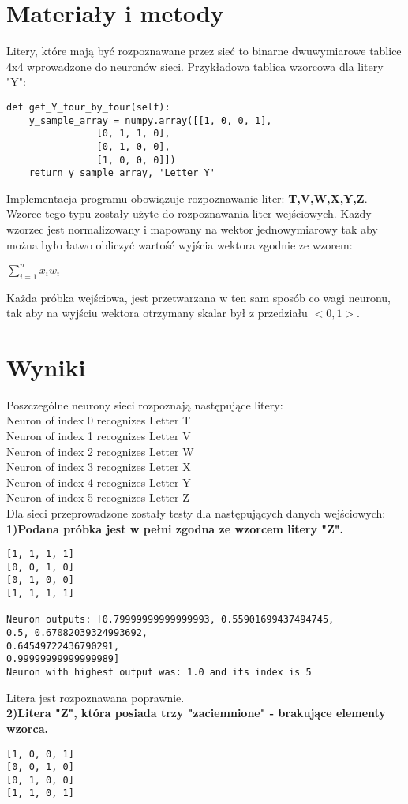 \documentclass{classrep}
\begin{document}
\section{Materiały i metody}
{Litery, które mają być rozpoznawane przez sieć to binarne dwuwymiarowe tablice 4x4 wprowadzone do neuronów sieci. Przykładowa tablica wzorcowa dla litery "Y":
\begin{lstlisting}
def get_Y_four_by_four(self):
	y_sample_array = numpy.array([[1, 0, 0, 1],
				[0, 1, 1, 0],
				[0, 1, 0, 0],
				[1, 0, 0, 0]])
	return y_sample_array, 'Letter Y'
\end{lstlisting}
Implementacja programu obowiązuje rozpoznawanie liter: \textbf{T,V,W,X,Y,Z}. Wzorce tego typu zostały użyte do rozpoznawania liter wejściowych. Każdy wzorzec jest normalizowany i mapowany na wektor jednowymiarowy tak aby można było łatwo obliczyć wartość wyjścia wektora zgodnie ze wzorem:
\begin{center}$\sum_{i=1}^{n} x_iw_i$\end{center}

Każda próbka wejściowa, jest przetwarzana w ten sam sposób co wagi neuronu, tak aby na wyjściu wektora otrzymany skalar był z przedziału $<0,1>$.
\section{Wyniki}
{Poszczególne neurony sieci rozpoznają następujące litery:
\\Neuron of index 0 recognizes Letter T
\\Neuron of index 1 recognizes Letter V
\\Neuron of index 2 recognizes Letter W
\\Neuron of index 3 recognizes Letter X
\\Neuron of index 4 recognizes Letter Y
\\Neuron of index 5 recognizes Letter Z
\\Dla sieci przeprowadzone zostały testy dla następujących danych wejściowych:\\
\textbf{1)Podana próbka jest w pełni zgodna ze wzorcem litery "Z".}
\begin{lstlisting}
[1, 1, 1, 1]
[0, 0, 1, 0]
[0, 1, 0, 0]
[1, 1, 1, 1]

Neuron outputs: [0.79999999999999993, 0.55901699437494745,
0.5, 0.67082039324993692,
0.64549722436790291,
0.99999999999999989]
Neuron with highest output was: 1.0 and its index is 5
\end{lstlisting}
Litera jest rozpoznawana poprawnie.
\\
\textbf{2)Litera "Z", która posiada trzy "zaciemnione" - brakujące elementy wzorca.}  
\begin{lstlisting}
[1, 0, 0, 1]
[0, 0, 1, 0]
[0, 1, 0, 0]
[1, 1, 0, 1]


\end{lstlisting}}}
\end{document}
